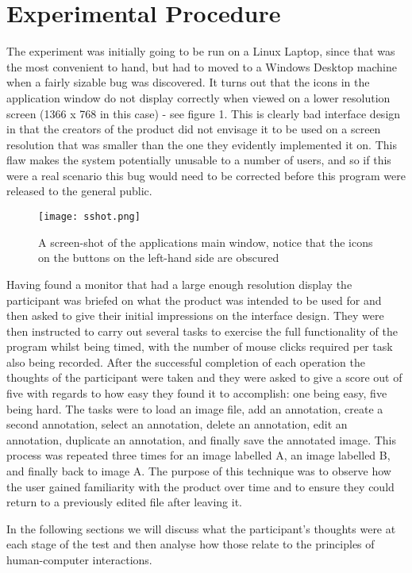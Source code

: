 \section{Experimental Procedure}

The experiment was initially going to be run on a Linux Laptop, since that was the most convenient to hand, but had to moved to a Windows Desktop machine when a fairly sizable bug was discovered.  It turns out that the icons in the application window do not display correctly when viewed on a lower resolution screen (1366 x 768 in this case) - see figure 1.  This is clearly bad interface design in that the creators of the product did not envisage it to be used on a screen resolution that was smaller than the one they evidently implemented it on.  This flaw makes the system potentially unusable to a number of users, and so if this were a real scenario this bug would need to be corrected before this program were released to the general public.

\begin{figure}[t]
\centering
\texttt{[image: sshot.png]}
\caption{A screen-shot of the applications main window, notice that the icons on the buttons on the left-hand side are obscured}
\label{fig:fullView}
\end{figure}

Having found a monitor that had a large enough resolution display the participant was briefed on what the product was intended to be used for and then asked to give their initial impressions on the interface design.  They were then instructed to carry out several tasks to exercise the full functionality of the program whilst being timed, with the number of mouse clicks required per task also being recorded.  After the successful completion of each operation the thoughts of the participant were taken and they were asked to give a score out of five with regards to how easy they found it to accomplish: one being easy, five being hard.  The tasks were to load an image file, add an annotation, create a second annotation, select an annotation, delete an annotation, edit an annotation, duplicate an annotation, and finally save the annotated image.  This process was repeated three times for an image labelled A, an image labelled B, and finally back to image A.  The purpose of this technique was to observe how the user gained familiarity with the product over time and to ensure they could return to a previously edited file after leaving it.

In the following sections we will discuss what the participant’s thoughts were at each stage of the test and then analyse how those relate to the principles of human-computer interactions.
